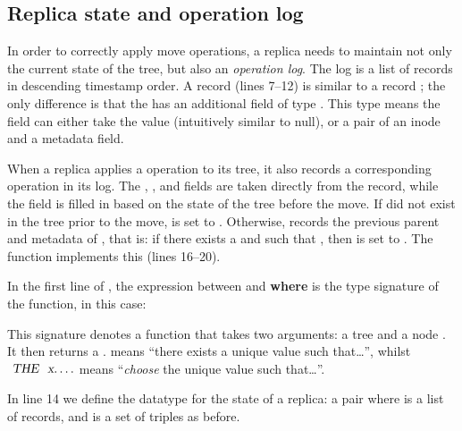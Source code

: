 \documentclass[sigconf]{acmart}
\begin{document}
\subsection{Replica state and operation log}\label{sec:state-log}

In order to correctly apply move operations, a replica needs to maintain not only the current state of the tree, but also an \emph{operation log}.
The log is a list of  records in descending timestamp order.
A  record (lines 7--12) is similar to a record ; the only difference is that the  has an additional field  of type .
This  type means the field can either take the value  (intuitively similar to null), or a pair of an inode and a metadata field.

When a replica applies a  operation to its tree, it also records a corresponding  operation in its log.
The , ,  and  fields are taken directly from the  record, while the  field is filled in based on the state of the tree before the move.
If  did not exist in the tree prior to the move,  is set to .
Otherwise,  records the previous parent and metadata of , that is: if there exists a  and  such that , then  is set to .
The  function implements this (lines 16--20).

In the first line of , the expression between \isa{::} and \textbf{where} is the type signature of the function, in this case:
\begin{quote}
\end{quote}
This signature denotes a function that takes two arguments: a tree  and a node .
It then returns a .
 means ``there exists a unique value  such that\dots'', whilst $\isa{THE}\ \isa{x}. \ldots$ means ``\emph{choose} the unique value  such that\ldots''.

In line 14 we define the datatype for the state of a replica: a pair  where  is a list of  records, and  is a set of  triples as before.
\end{document}
